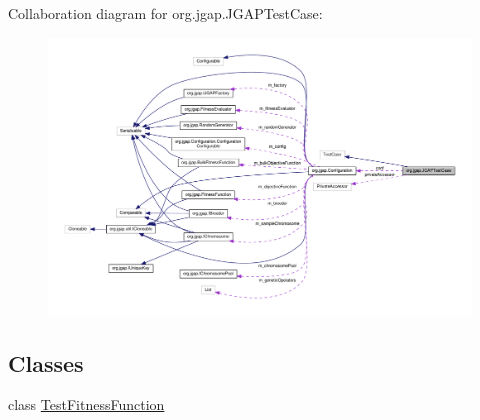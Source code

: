 Collaboration diagram for org.\-jgap.\-J\-G\-A\-P\-Test\-Case\-:
\nopagebreak
\begin{figure}[H]
\begin{center}
\leavevmode
\includegraphics[width=350pt]{classorg_1_1jgap_1_1_j_g_a_p_test_case__coll__graph}
\end{center}
\end{figure}
\subsection*{Classes}
\begin{DoxyCompactItemize}
\item 
class \hyperlink{classorg_1_1jgap_1_1_j_g_a_p_test_case_1_1_test_fitness_function}{Test\-Fitness\-Function}
\end{DoxyCompactItemize}
